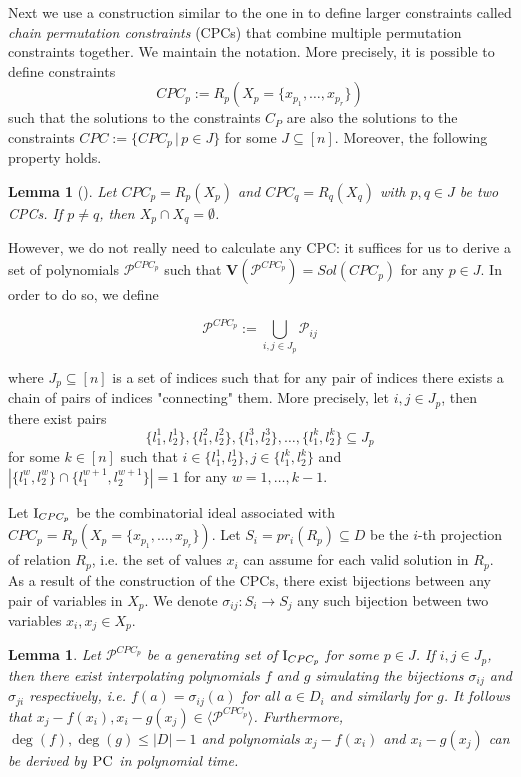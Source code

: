 \documentclass[11pt]{article}
\newcommand{\PC}{\textsc{PC}}
\newcommand{\Variety}[1]{{\textbf{V}}\left( #1 \right)}
\newcommand{\I}{\emph{$\rm{I}$}}
\newcommand{\1}{\textbf{1}}
\newtheorem{lemma}[theorem]{Lemma}
\begin{document}
Next we use a construction similar to the one in \cite{BharathiM21, BharathiM25} to define larger constraints called \emph{chain permutation constraints} (CPCs) that combine multiple permutation constraints together. We maintain the notation. More precisely, it is possible to define constraints
\begin{equation*}
    CPC_p := R_p(X_p = \{ x_{p_1}, \ldots, x_{p_r} \})
\end{equation*}
such that the solutions to the constraints $C_{P}$ are also the solutions to the constraints $CPC := \{CPC_p \, | \, p \in J\}$ for some $J \subseteq [n]$. Moreover, the following property holds.

\begin{lemma}[\cite{BharathiM21, BharathiM25}]
    Let $CPC_p = R_p(X_p)$ and $CPC_q = R_q(X_q)$ with $p,q \in J$ be two CPCs. If $p \neq q$, then $X_p \cap X_q = \emptyset$.
\end{lemma}

However, we do not really need to calculate any CPC: it suffices for us to derive a set of polynomials $\mathcal{P}^{CPC_p}$ such that $\Variety{\mathcal{P}^{CPC_p}} = Sol(CPC_p)$ for any $p \in J$. In order to do so, we define

\begin{equation*}
    \mathcal{P}^{CPC_p} := \bigcup_{i,j \in J_p} \mathcal{P}_{ij}
\end{equation*}

where $J_p \subseteq [n]$ is a set of indices such that for any pair of indices there exists a chain of pairs of indices "connecting" them. More precisely, let $i,j \in J_p$, then there exist pairs $$\{ l_1^1, l_2^1 \}, \{ l_1^2, l_2^2 \}, \{l_1^3, l_2^3\}, \ldots, \{l_1^k, l_2^k\} \subseteq J_p$$ for some $k \in [n]$ such that $i \in \{ l_1^1, l_2^1 \}, j \in \{l_1^k, l_2^k\}$ and $|\{l_1^w, l_2^w\} \cap \{l_1^{w+1}, l_2^{w+1}\}| = 1$ for any $w = 1, \ldots, k-1$.

Let $\I_{CPC_p}$ be the combinatorial ideal associated with $CPC_p = R_p(X_p = \{x_{p_1}, \ldots, x_{p_r} \})$. Let $S_i = pr_i(R_p) \subseteq D$ be the $i$-th projection of relation $R_p$, i.e. the set of values $x_i$ can assume for each valid solution in $R_p$. As a result of the construction of the CPCs, there exist bijections between any pair of variables in $X_p$. We denote $\sigma_{ij}: S_i \rightarrow S_j$ any such bijection between two variables $x_i, x_j \in X_p$.

\begin{lemma}
    Let $\mathcal{P}^{CPC_p}$ be a generating set of $\I_{CPC_p}$ for some $p \in J$. If $i,j \in J_p$, then there exist interpolating polynomials $f$ and $g$ simulating the bijections $\sigma_{ij}$ and $\sigma_{ji}$ respectively, i.e. $f(a) = \sigma_{ij}(a)$ for all $a \in D_i$ and similarly for $g$. It follows that $x_j - f(x_i), x_i - g(x_j) \in \langle \mathcal{P}^{CPC_p} \rangle$. Furthermore, $\deg(f), \deg(g) \leq |D| - 1$ and polynomials $x_j - f(x_i)$ and $ x_i - g(x_j)$ can be derived by $\PC$ in polynomial time.
\end{lemma}
\end{document}
